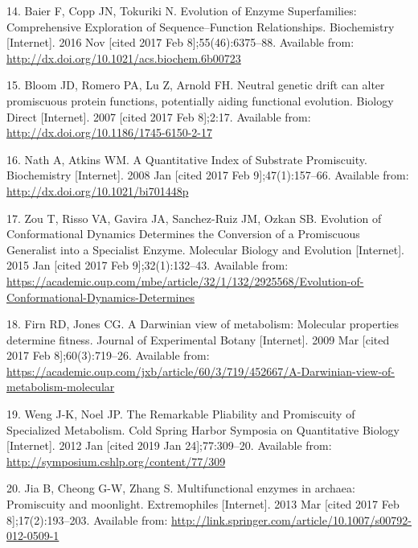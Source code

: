 \documentclass[12pt,twoside]{reedthesis}
\begin{document}
  \hypertarget{ref-baier_evolution_2016}{}
  14. Baier F, Copp JN, Tokuriki N. Evolution of Enzyme Superfamilies:
  Comprehensive Exploration of Sequence--Function Relationships.
  Biochemistry {[}Internet{]}. 2016 Nov {[}cited 2017 Feb
  8{]};55(46):6375--88. Available from:
  \url{http://dx.doi.org/10.1021/acs.biochem.6b00723}
  
  \hypertarget{ref-bloom_neutral_2007}{}
  15. Bloom JD, Romero PA, Lu Z, Arnold FH. Neutral genetic drift can
  alter promiscuous protein functions, potentially aiding functional
  evolution. Biology Direct {[}Internet{]}. 2007 {[}cited 2017 Feb
  8{]};2:17. Available from:
  \url{http://dx.doi.org/10.1186/1745-6150-2-17}
  
  \hypertarget{ref-nath_quantitative_2008}{}
  16. Nath A, Atkins WM. A Quantitative Index of Substrate Promiscuity.
  Biochemistry {[}Internet{]}. 2008 Jan {[}cited 2017 Feb
  9{]};47(1):157--66. Available from:
  \url{http://dx.doi.org/10.1021/bi701448p}
  
  \hypertarget{ref-zou_evolution_2015}{}
  17. Zou T, Risso VA, Gavira JA, Sanchez-Ruiz JM, Ozkan SB. Evolution of
  Conformational Dynamics Determines the Conversion of a Promiscuous
  Generalist into a Specialist Enzyme. Molecular Biology and Evolution
  {[}Internet{]}. 2015 Jan {[}cited 2017 Feb 9{]};32(1):132--43. Available
  from:
  \url{https://academic.oup.com/mbe/article/32/1/132/2925568/Evolution-of-Conformational-Dynamics-Determines}
  
  \hypertarget{ref-firn_darwinian_2009}{}
  18. Firn RD, Jones CG. A Darwinian view of metabolism: Molecular
  properties determine fitness. Journal of Experimental Botany
  {[}Internet{]}. 2009 Mar {[}cited 2017 Feb 8{]};60(3):719--26. Available
  from:
  \url{https://academic.oup.com/jxb/article/60/3/719/452667/A-Darwinian-view-of-metabolism-molecular}
  
  \hypertarget{ref-weng_promiscuity_specialized_pathways_2012}{}
  19. Weng J-K, Noel JP. The Remarkable Pliability and Promiscuity of
  Specialized Metabolism. Cold Spring Harbor Symposia on Quantitative
  Biology {[}Internet{]}. 2012 Jan {[}cited 2019 Jan 24{]};77:309--20.
  Available from: \url{http://symposium.cshlp.org/content/77/309}
  
  \hypertarget{ref-jia_multifunctional_2013}{}
  20. Jia B, Cheong G-W, Zhang S. Multifunctional enzymes in archaea:
  Promiscuity and moonlight. Extremophiles {[}Internet{]}. 2013 Mar
  {[}cited 2017 Feb 8{]};17(2):193--203. Available from:
  \url{http://link.springer.com/article/10.1007/s00792-012-0509-1}
  
\end{document}
